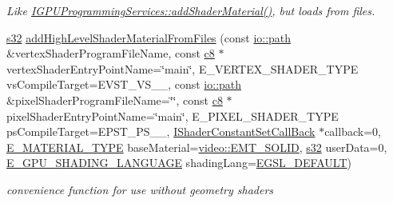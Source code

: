 \begin{DoxyCompactItemize}
\begin{DoxyCompactList}\small\item\em Like \hyperlink{classirr_1_1video_1_1IGPUProgrammingServices_af7c7515773d4be33e1c66b8e3b65c293}{I\+G\+P\+U\+Programming\+Services\+::add\+Shader\+Material()}, but loads from files. \end{DoxyCompactList}\item 
\mbox{\label{classirr_1_1video_1_1IGPUProgrammingServices_a2e6abff7d3e976d65955aae13df5e500}} 
\hyperlink{namespaceirr_ac66849b7a6ed16e30ebede579f9b47c6}{s32} \hyperlink{classirr_1_1video_1_1IGPUProgrammingServices_a2e6abff7d3e976d65955aae13df5e500}{add\+High\+Level\+Shader\+Material\+From\+Files} (const \hyperlink{namespaceirr_1_1io_ab1bdc45edb3f94d8319c02bc0f840ee1}{io\+::path} \&vertex\+Shader\+Program\+File\+Name, const \hyperlink{namespaceirr_a9395eaea339bcb546b319e9c96bf7410}{c8} $\ast$vertex\+Shader\+Entry\+Point\+Name=\char`\"{}main\char`\"{}, E\+\_\+\+V\+E\+R\+T\+E\+X\+\_\+\+S\+H\+A\+D\+E\+R\+\_\+\+T\+Y\+PE vs\+Compile\+Target=E\+V\+S\+T\+\_\+\+V\+S\+\_\+\_, const \hyperlink{namespaceirr_1_1io_ab1bdc45edb3f94d8319c02bc0f840ee1}{io\+::path} \&pixel\+Shader\+Program\+File\+Name=\char`\"{}\char`\"{}, const \hyperlink{namespaceirr_a9395eaea339bcb546b319e9c96bf7410}{c8} $\ast$pixel\+Shader\+Entry\+Point\+Name=\char`\"{}main\char`\"{}, E\+\_\+\+P\+I\+X\+E\+L\+\_\+\+S\+H\+A\+D\+E\+R\+\_\+\+T\+Y\+PE ps\+Compile\+Target=E\+P\+S\+T\+\_\+\+P\+S\+\_\+\_, \hyperlink{classirr_1_1video_1_1IShaderConstantSetCallBack}{I\+Shader\+Constant\+Set\+Call\+Back} $\ast$callback=0, \hyperlink{namespaceirr_1_1video_ac8e9b6c66f7cebabd1a6d30cbc5430f1}{E\+\_\+\+M\+A\+T\+E\+R\+I\+A\+L\+\_\+\+T\+Y\+PE} base\+Material=\hyperlink{namespaceirr_1_1video_ac8e9b6c66f7cebabd1a6d30cbc5430f1a9bc471b9c18c9e2d20496004d2a2e803}{video\+::\+E\+M\+T\+\_\+\+S\+O\+L\+ID}, \hyperlink{namespaceirr_ac66849b7a6ed16e30ebede579f9b47c6}{s32} user\+Data=0, \hyperlink{namespaceirr_1_1video_a913671e32f20f13e51336bfbe20a82a3}{E\+\_\+\+G\+P\+U\+\_\+\+S\+H\+A\+D\+I\+N\+G\+\_\+\+L\+A\+N\+G\+U\+A\+GE} shading\+Lang=\hyperlink{namespaceirr_1_1video_a913671e32f20f13e51336bfbe20a82a3ac65c039e1c80a430a816c450a5f30d4b}{E\+G\+S\+L\+\_\+\+D\+E\+F\+A\+U\+LT})
\begin{DoxyCompactList}\small\item\em convenience function for use without geometry shaders \end{DoxyCompactList}\item 

\end{DoxyCompactItemize}
